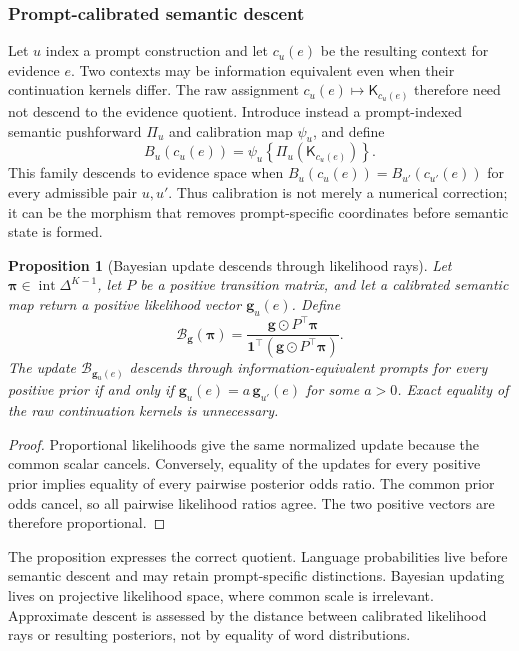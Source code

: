 \documentclass[11pt]{article}
\newtheorem{proposition}[definition]{Proposition}
\newcommand{\Kern}{\mathsf K}
\begin{document}
\subsubsection{Prompt-calibrated semantic descent}
Let $u$ index a prompt construction and let $c_u(e)$ be the resulting context for evidence $e$. Two contexts may be information equivalent even when their continuation kernels differ. The raw assignment
$c_u(e)\mapsto\Kern_{c_u(e)}$ therefore need not descend to the evidence quotient. Introduce instead a prompt-indexed semantic pushforward $\Pi_u$ and calibration map $\psi_u$, and define
\[
B_u(c_u(e))=\psi_u\!\left\{\Pi_u(\Kern_{c_u(e)})\right\}.
\]
This family descends to evidence space when $B_u(c_u(e))=B_{u'}(c_{u'}(e))$ for every admissible pair $u,u'$. Thus calibration is not merely a numerical correction; it can be the morphism that removes prompt-specific coordinates before semantic state is formed.

\begin{proposition}[Bayesian update descends through likelihood rays]\label{prop:bayes-descent}
Let $\bm\pi\in\operatorname{int}\Delta^{K-1}$, let $P$ be a positive transition matrix, and let a calibrated semantic map return a positive likelihood vector $\bm g_u(e)$. Define
\[
\mathcal B_{\bm g}(\bm\pi)
=\frac{\bm g\odot P^\top\bm\pi}
{\mathbf1^\top(\bm g\odot P^\top\bm\pi)}.
\]
The update $\mathcal B_{\bm g_u(e)}$ descends through information-equivalent prompts for every positive prior if and only if
$\bm g_u(e)=a\,\bm g_{u'}(e)$ for some $a>0$. Exact equality of the raw continuation kernels is unnecessary.
\end{proposition}

\begin{proof}
Proportional likelihoods give the same normalized update because the common scalar cancels. Conversely, equality of the updates for every positive prior implies equality of every pairwise posterior odds ratio. The common prior odds cancel, so all pairwise likelihood ratios agree. The two positive vectors are therefore proportional.
\end{proof}

The proposition expresses the correct quotient. Language probabilities live before semantic descent and may retain prompt-specific distinctions. Bayesian updating lives on projective likelihood space, where common scale is irrelevant. Approximate descent is assessed by the distance between calibrated likelihood rays or resulting posteriors, not by equality of word distributions.
\end{document}
